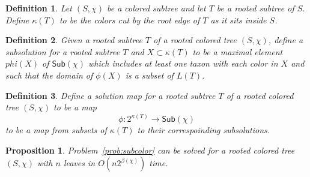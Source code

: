 \documentclass{amsart}
\newcommand{\col}{\chi}
\newcommand{\subcolS}{\mathsf{Sub}}
\newcommand{\cut}{\kappa}
\newcommand{\bad}{\beta}
\newtheorem{prop}{Proposition}
\newtheorem{defn}{Definition}
\begin{document}
\begin{defn}
  Let $(S, \col)$ be a colored subtree and let $T$ be a rooted subtree of $S$.
  Define $\cut(T)$ to be the colors cut by the root edge of $T$ as it sits inside $S$.
\end{defn}

\begin{defn}
  Given a rooted subtree $T$ of a rooted colored tree $(S, \col)$, define a subsolution for a rooted subtree $T$ and $X \subset \cut(T)$ to be a maximal element $phi(X)$ of $\subcolS(\col)$ which includes at least one taxon with each color in $X$ and such that the domain of $\phi(X)$ is a subset of $L(T)$.
\end{defn}

\begin{defn}
  Define a solution map for a rooted subtree $T$ of a rooted colored tree $(S, \col)$ to be a map
  \[
  \phi: 2^{\cut(T)} \rightarrow \subcolS(\col)
  \]
  to be a map from subsets of $\cut(T)$ to their correspoinding subsolutions.
\end{defn}


\begin{prop}
Problem~\ref{prob:subcolor} can be solved for a rooted colored tree $(S, \col)$ with $n$ leaves in $O(n 2^{\bad(\col)})$ time.
\end{prop}
\end{document}
